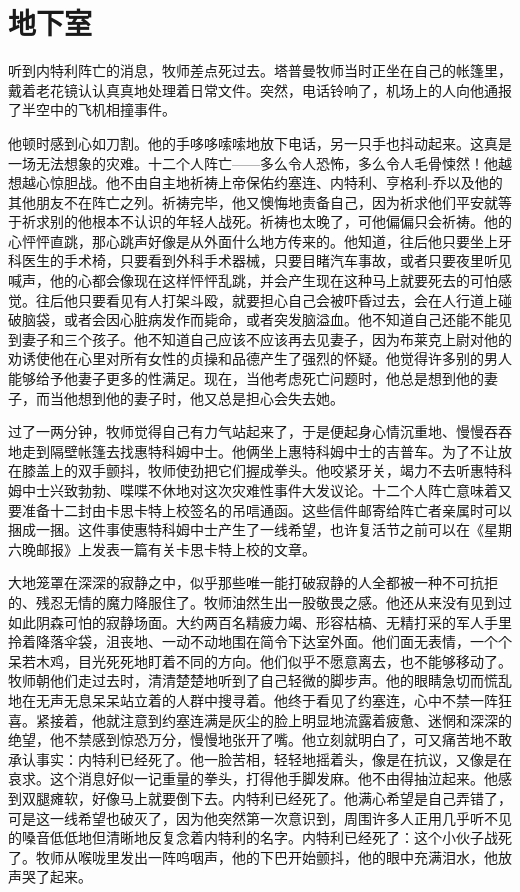 \chapter{地下室}

 
    听到内特利阵亡的消息，牧师差点死过去。塔普曼牧师当时正坐在自己的帐篷里，戴着老花镜认认真真地处理着日常文件。突然，电话铃响了，机场上的人向他通报了半空中的飞机相撞事件。

    他顿时感到心如刀割。他的手哆哆嗦嗦地放下电话，另一只手也抖动起来。这真是一场无法想象的灾难。十二个人阵亡——多么令人恐怖，多么令人毛骨悚然！他越想越心惊胆战。他不由自主地祈祷上帝保佑约塞连、内特利、亨格利-乔以及他的其他朋友不在阵亡之列。祈祷完毕，他又懊悔地责备自己，因为祈求他们平安就等于祈求别的他根本不认识的年轻人战死。祈祷也太晚了，可他偏偏只会祈祷。他的心怦怦直跳，那心跳声好像是从外面什么地方传来的。他知道，往后他只要坐上牙科医生的手术椅，只要看到外科手术器械，只要目睹汽车事故，或者只要夜里听见喊声，他的心都会像现在这样怦怦乱跳，并会产生现在这种马上就要死去的可怕感觉。往后他只要看见有人打架斗殴，就要担心自己会被吓昏过去，会在人行道上碰破脑袋，或者会因心脏病发作而毙命，或者突发脑溢血。他不知道自己还能不能见到妻子和三个孩子。他不知道自己应该不应该再去见妻子，因为布莱克上尉对他的劝诱使他在心里对所有女性的贞操和品德产生了强烈的怀疑。他觉得许多别的男人能够给予他妻子更多的性满足。现在，当他考虑死亡问题时，他总是想到他的妻子，而当他想到他的妻子时，他又总是担心会失去她。

    过了一两分钟，牧师觉得自己有力气站起来了，于是便起身心情沉重地、慢慢吞吞地走到隔壁帐篷去找惠特科姆中士。他俩坐上惠特科姆中士的吉普车。为了不让放在膝盖上的双手颤抖，牧师使劲把它们握成拳头。他咬紧牙关，竭力不去听惠特科姆中士兴致勃勃、喋喋不休地对这次灾难性事件大发议论。十二个人阵亡意味着又要准备十二封由卡思卡特上校签名的吊唁通函。这些信件邮寄给阵亡者亲属时可以捆成一捆。这件事使惠特科姆中士产生了一线希望，也许复活节之前可以在《星期六晚邮报》上发表一篇有关卡思卡特上校的文章。

    大地笼罩在深深的寂静之中，似乎那些唯一能打破寂静的人全都被一种不可抗拒的、残忍无情的魔力降服住了。牧师油然生出一股敬畏之感。他还从来没有见到过如此阴森可怕的寂静场面。大约两百名精疲力竭、形容枯槁、无精打采的军人手里拎着降落伞袋，沮丧地、一动不动地围在简令下达室外面。他们面无表情，一个个呆若木鸡，目光死死地盯着不同的方向。他们似乎不愿意离去，也不能够移动了。牧师朝他们走过去时，清清楚楚地听到了自己轻微的脚步声。他的眼睛急切而慌乱地在无声无息呆呆站立着的人群中搜寻着。他终于看见了约塞连，心中不禁一阵狂喜。紧接着，他就注意到约塞连满是灰尘的脸上明显地流露着疲惫、迷惘和深深的绝望，他不禁感到惊恐万分，慢慢地张开了嘴。他立刻就明白了，可又痛苦地不敢承认事实：内特利已经死了。他一脸苦相，轻轻地摇着头，像是在抗议，又像是在哀求。这个消息好似一记重量的拳头，打得他手脚发麻。他不由得抽泣起来。他感到双腿瘫软，好像马上就要倒下去。内特利已经死了。他满心希望是自己弄错了，可是这一线希望也破灭了，因为他突然第一次意识到，周围许多人正用几乎听不见的嗓音低低地但清晰地反复念着内特利的名字。内特利已经死了：这个小伙子战死了。牧师从喉咙里发出一阵呜咽声，他的下巴开始颤抖，他的眼中充满泪水，他放声哭了起来。

